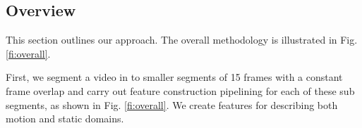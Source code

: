 
\subsection{Overview}

This section outlines our approach. The overall methodology is illustrated in Fig. \ref{fi:overall}.



\begin{figure*}
  \centering
  
  \caption{\textbf{Overall methodology}. The whole process consists of five major steps: (i) segmenting a video (ii) crafting static features, (iii) crafting motion features,
  (iv) fusing static and motion features, and (v) capturing temporal evolution of sub events. Static and motion features are independent
  and complementary. We generate static and motion features based on a pre-trained CNN and
  motion tubes respectively, and capture the temporal evolution of sub events using a LSTM network.}

 \label{fi:overall}
\end{figure*}


First, we segment a video in to smaller segments of 15 frames with a constant frame overlap
and carry out feature construction pipelining for each of these sub segments, as shown in Fig. \ref{fi:overall}.
We create features for describing both motion and static domains.

